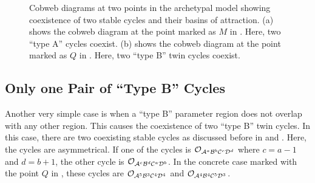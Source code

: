 \begin{figure}
	\centering
	\caption[Cobweb diagrams of the archetypal model showing coexistence of two cycles]{
		Cobweb diagrams at two points in the archetypal model showing coexistence of two stable cycles and their basins of attraction.
		(a) shows the cobweb diagram at the point marked as $M$ in .
		Here, two ``type A'' cycles coexist.
		(b) shows the cobweb diagram at the point marked as $Q$ in .
		Here, two ``type B'' twin cycles coexist.
	}
\end{figure}

\subsection{Only one Pair of ``Type B'' Cycles}

Another very simple case is when a ``type B'' parameter region does not overlap with any other region.
This causes the coexistence of two ``type B'' twin cycles.
In this case, there are two coexisting stable cycles as discussed before in  and .
Here, the cycles are asymmetrical.
If one of the cycles is $\mathcal{O}_{\mathcal{A}^a\mathcal{B}^b\mathcal{C}^c\mathcal{D}^d}$ where $c = a - 1$ and $d = b + 1$, the other cycle is $\mathcal{O}_{\mathcal{A}^c\mathcal{B}^d\mathcal{C}^a\mathcal{D}^b}$.
In the concrete case marked with the point $Q$ in , these cycles are $\mathcal{O}_{\mathcal{A}^5\mathcal{B}^3\mathcal{C}^4\mathcal{D}^4}$ and $\mathcal{O}_{\mathcal{A}^4\mathcal{B}^4\mathcal{C}^5\mathcal{D}^3}$.

